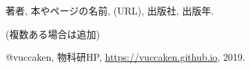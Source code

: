 \documentclass[10pt,b5paper,papersize,dvipdfmx]{jsbook}
\begin{document}
\newpage

\begin{thebibliography}{99}
  \item 著者, 本やページの名前, (URL), 出版社, 出版年.
  \item (複数ある場合は追加)
  \item @vuccaken, 物科研HP, \url{https://vuccaken.github.io}, 2019.
\end{thebibliography}
\end{document}
